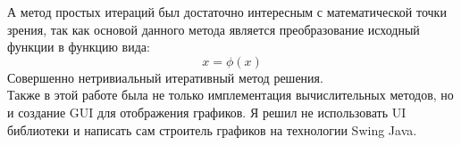 \documentclass[11pt, english]{article}
\begin{document}
А метод простых итераций был достаточно интересным с математической точки зрения, так как основой данного метода является преобразование исходный функции в функцию вида:
$$x = \phi(x)$$
Совершенно нетривиальный итеративный метод решения. \\

Также в этой работе была не только имплементация вычислительных методов, но и создание GUI для отображения графиков. Я решил не использовать UI библиотеки и написать сам строитель графиков на технологии Swing Java.
\end{document}
